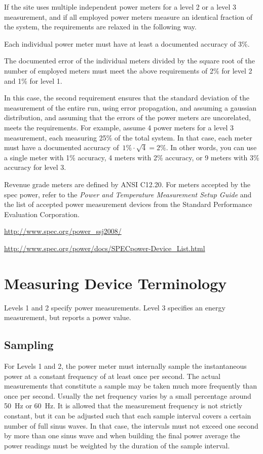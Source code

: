 \noindent
If the site uses multiple independent power meters for a level 2 or a level 3 measurement, and if all employed power meters measure an identical fraction of the system, the requirements are relaxed in the following way.
\begin{packed_item}
\item 
Each individual power meter must have at least a documented accuracy of 3\%.
\item
The documented error of the individual meters divided by the square root of the number of employed meters must meet the above requirements of 2\% for level 2 and 1\% for level 1.
\end{packed_item}
In this case, the second requirement ensures that the standard deviation of the measurement of the entire run, using error propagation, and assuming a gaussian distribution, and assuming that the errors of the power meters are uncorelated, meets the requirements.
For example, assume 4 power meters for a level 3 measurement, each measuring 25\% of the total system.
In that case, each meter must have a documented accuracy of~$1\% \cdot \sqrt{4} = 2\%$.
In other words, you can use a single meter with 1\% accuracy, 4 meters with 2\% accuracy, or 9 meters with 3\% accuracy for level 3.
\wl

\noindent
Revenue grade meters are defined by ANSI C12.20.
For meters accepted by the spec power, refer to the {\itshape Power and Temperature Measurement Setup Guide \/} and the list of accepted power measurement devices from the Standard Performance Evaluation Corporation.
\begin{packed_item}
\item 
\url{http://www.spec.org/power_ssj2008/}
\item
\url{http://www.spec.org/power/docs/SPECpower-Device_List.html }
\end{packed_item}
\wl

\section{Measuring Device Terminology}
\label{sec:MDTerm}
\noindent
Levels 1 and 2 specify power measurements. Level 3 specifies an energy measurement, but reports a power value.

\subsection{Sampling}
\noindent
For Levels 1 and 2, the power meter must internally sample the instantaneous power at a constant frequency of at least once per second.
The actual measurements that constitute a sample may be taken much more frequently than once per second.
Usually the net frequency varies by a small percentage around 50~Hz or 60~Hz.
It is allowed that the measurement frequency is not strictly constant, but it can be adjusted such that each sample interval covers a certain number of full sinus waves.
In that case, the intervals must not exceed one second by more than one sinus wave and when building the final power average the power readings must be weighted by the duration of the sample interval.
\wl

